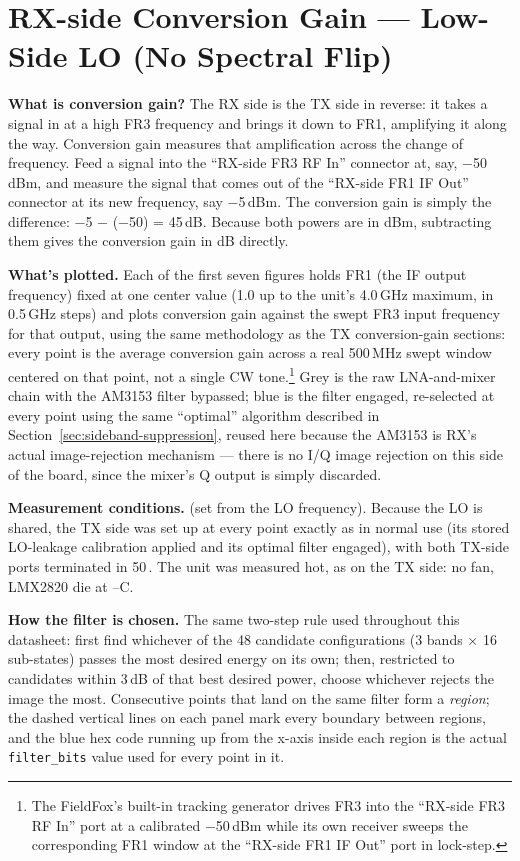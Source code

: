 \clearpage
\section{RX-side Conversion Gain --- Low-Side LO (No Spectral Flip)}
\label{sec:rx-gain-lowside}

\textbf{What is conversion gain?} The RX side is the TX side in reverse: it takes a signal in at a high FR3
frequency and brings it down to FR1, amplifying it along the way. Conversion gain measures that amplification
across the change of frequency. Feed a signal into the ``RX-side FR3 RF In'' connector at, say, −50\,dBm, and
measure the signal that comes out of the ``RX-side FR1 IF Out'' connector at its new frequency, say −5\,dBm. The conversion
gain is simply the difference: −5 − (−50) = 45\,dB. Because both powers are in dBm, subtracting them gives the
conversion gain in dB directly.

\textbf{What's plotted.} Each of the first seven figures holds FR1 (the IF output frequency) fixed at one
center value (1.0 up to the unit's 4.0\,GHz maximum, in 0.5\,GHz steps) and plots conversion gain against the
swept FR3 input frequency for that output, using the same methodology as the TX conversion-gain sections: every
point is the average conversion gain across a real 500\,MHz swept window centered on that point, not a single
CW tone.\footnote{The FieldFox's built-in tracking generator drives FR3 into the ``RX-side FR3 RF In'' port at a
calibrated
−50\,dBm while its own receiver sweeps the corresponding FR1 window at the ``RX-side FR1 IF Out'' port
in lock-step.} Grey is the raw LNA-and-mixer chain with the AM3153 filter bypassed; blue is the filter engaged,
re-selected at every point using the same ``optimal'' algorithm described in
Section~\ref{sec:sideband-suppression}, reused here because the AM3153 is RX's actual image-rejection mechanism
--- there is no I/Q image rejection on this side of the board, since the mixer's Q output is simply discarded.

\textbf{Measurement conditions.} \lmxDriveRule{} (set from the LO frequency). Because the LO is shared, the TX side was set up at every point exactly as in normal use (its stored LO-leakage calibration applied and its optimal filter engaged), with both TX-side ports terminated in 50\,\textohm. The unit was measured hot, as on the TX side: no fan, LMX2820 die at \condRxGainMinC--\condRxGainMaxC\textdegree C.

\textbf{How the filter is chosen.} The same two-step rule used throughout this datasheet: first find whichever
of the 48 candidate configurations (3 bands × 16 sub-states) passes the most desired energy on its own;
then, restricted to candidates within 3\,dB of that best desired power, choose whichever rejects the image the
most. Consecutive points that land on the same filter form a \emph{region}; the dashed vertical lines on each
panel mark every boundary between regions, and the blue hex code running up from the x-axis inside each region
is the actual \texttt{filter\_bits} value used for every point in it.

